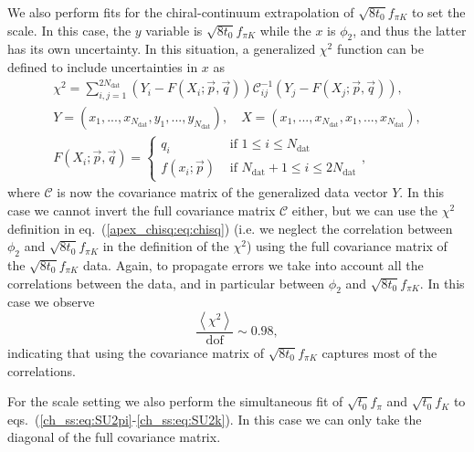 We also perform fits for the chiral-continuum extrapolation of $\sqrt{8t_0}f_{\pi K}$ to set the scale. In this case, the $y$ variable is $\sqrt{8t_0}f_{\pi K}$ while the $x$ is $\phi_2$, and thus the latter has its own uncertainty. In this situation, a generalized $\chi^2$ function can be defined to include uncertainties in $x$ as
\begin{gather}
\label{apex_chisq:eq:chisq_generalized}
\chi^2=\sum_{i,j=1}^{2N_{\textrm{dat}}}\left(Y_i-F(X_i;\vec{p},\vec{q})\right)\mathcal{C}_{ij}^{-1}\left(Y_j-F(X_j;\vec{p},\vec{q})\right), \\
Y=(x_1,...,x_{N_{\textrm{dat}}},y_1,...,y_{N_{\textrm{dat}}}), \quad
X=(x_1,...,x_{N_{\textrm{dat}}},x_1,...,x_{N_{\textrm{dat}}}), \\
F(X_i;\vec{p},\vec{q})=\left\{\begin{matrix}
q_i & \textrm{ if $1\leq i\leq N_{\textrm{dat}}$} \\ 
f(x_i;\vec{p}) & \textrm{ if $N_{\textrm{dat}}+1\leq i\leq 2N_{\textrm{dat}}$}
\end{matrix}\right.,
\end{gather}
where $\mathcal{C}$ is now the covariance matrix of the generalized data vector $Y$. In this case we cannot invert the full covariance matrix $\mathcal{C}$ either, but we can use the $\chi^2$ definition in eq.~(\ref{apex_chisq:eq:chisq}) (i.e. we neglect the correlation between $\phi_2$ and $\sqrt{8t_0}f_{\pi K}$ in the definition of the $\chi^2$) using the full covariance matrix of the $\sqrt{8t_0}f_{\pi K}$ data. Again, to propagate errors we take into account all the correlations between the data, and in particular between $\phi_2$ and $\sqrt{8t_0}f_{\pi K}$. In this case we observe
\begin{equation}
\frac{\left<\chi^2\right>}{{\textrm{dof}}}\sim0.98,
\end{equation}
indicating that using the covariance matrix of $\sqrt{8t_0}f_{\pi K}$ captures most of the correlations.

For the scale setting we also perform the simultaneous fit of $\sqrt{t_0}f_{\pi}$ and $\sqrt{t_0}f_K$ to eqs.~(\ref{ch_ss:eq:SU2pi}-\ref{ch_ss:eq:SU2k}). In this case we can only take the diagonal of the full covariance matrix.



